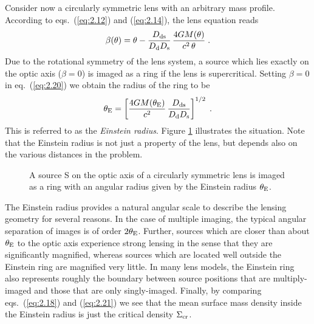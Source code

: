 \documentclass[a4paper,10pt]{article} %
\begin{document}
Consider now a circularly symmetric lens with an arbitrary mass
profile. According to eqs.\ (\ref{eq:2.12}) and (\ref{eq:2.14}), the
lens equation reads
\begin{equation}
  \beta(\theta) = \theta-\frac{D_{\rm ds}}{D_{\rm d}D_{\rm s}}\,
  \frac{4GM(\theta)}{c^2\,\theta}\;.
\label{eq:2.20}
\end{equation}
Due to the rotational symmetry of the lens system, a source which lies
exactly on the optic axis ($\beta=0$) is imaged as a ring if the lens
is supercritical. Setting $\beta=0$ in eq.\ (\ref{eq:2.20}) we obtain
the radius of the ring to be
\begin{equation}
  \theta_{\rm E} = \left[\frac{4GM(\theta_{\rm E})}{c^2}\,
  \frac{D_{\rm ds}}{D_{\rm d}D_{\rm s}}\right]^{1/2}\;.
\label{eq:2.21}
\end{equation}
This is referred to as the {\em Einstein radius\/}. Figure
\ref{NB:fig2.5} illustrates the situation. Note that the Einstein
radius is not just a property of the lens, but depends also on the
various distances in the problem.

\begin{figure}[ht] %
\begin{center}
\begin{minipage}[t]{0.6\hsize}
\end{minipage}
\end{center}
\caption{A source S on the optic axis of a circularly symmetric lens
  is imaged as a ring with an angular radius given by the Einstein
  radius $\theta_{\rm E}$.}
\label{NB:fig2.5}
\end{figure}

The Einstein radius provides a natural angular scale to describe the
lensing geometry for several reasons. In the case of multiple imaging,
the typical angular separation of images is of order $2\theta_{\rm
E}$. Further, sources which are closer than about $\theta_{\rm E}$ to
the optic axis experience strong lensing in the sense that they are
significantly magnified, whereas sources which are located well
outside the Einstein ring are magnified very little. In many lens
models, the Einstein ring also represents roughly the boundary between
source positions that are multiply-imaged and those that are only
singly-imaged. Finally, by comparing eqs.\ (\ref{eq:2.18}) and
(\ref{eq:2.21}) we see that the mean surface mass density inside the
Einstein radius is just the critical density $\Sigma_{\rm cr}$.
\end{document}
